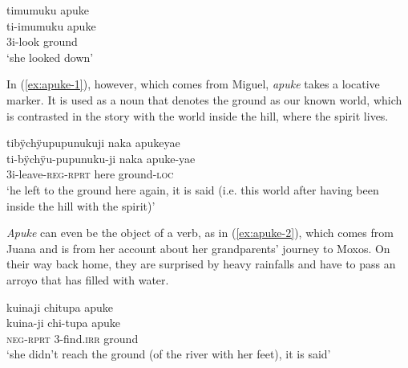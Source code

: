 \ea\label{ex:apuke-3}
\begingl
\glpreamble timumuku apuke\\
\gla ti-imumuku apuke\\
\glb 3i-look ground\\
\glft ‘she looked down’
\endgl
\trailingcitation{[jxx-p110923l-1.412]}
\xe

In (\ref{ex:apuke-1}), however, which comes from Miguel, \textit{apuke} takes a locative marker. It is used as a noun that denotes the ground as our known world, which is contrasted in the story with the world inside the hill, where the spirit lives.

\ea\label{ex:apuke-1}
\begingl
\glpreamble tibÿchÿupupunukuji naka apukeyae\\
\gla ti-bÿchÿu-pupunuku-ji naka apuke-yae\\
\glb 3i-leave-\textsc{reg}-\textsc{rprt} here ground-\textsc{loc}\\
\glft ‘he left to the ground here again, it is said (i.e. this world after having been inside the hill with the spirit)’
\endgl
\trailingcitation{[mxx-n151017l-1.58]}
\xe

\textit{Apuke} can even be the object of a verb, as in (\ref{ex:apuke-2}), which comes from Juana and is from her account about her grandparents’ journey to Moxos. On their way back home, they are surprised by heavy rainfalls and have to pass an arroyo that has filled with water.

\ea\label{ex:apuke-2}
\begingl
\glpreamble kuinaji chitupa apuke\\
\gla kuina-ji chi-tupa apuke\\
\glb \textsc{neg}-\textsc{rprt} 3-find.\textsc{irr} ground\\
\glft ‘she didn’t reach the ground (of the river with her feet), it is said’
\endgl
\trailingcitation{[jxx-p151016l-2.144]}
\xe




